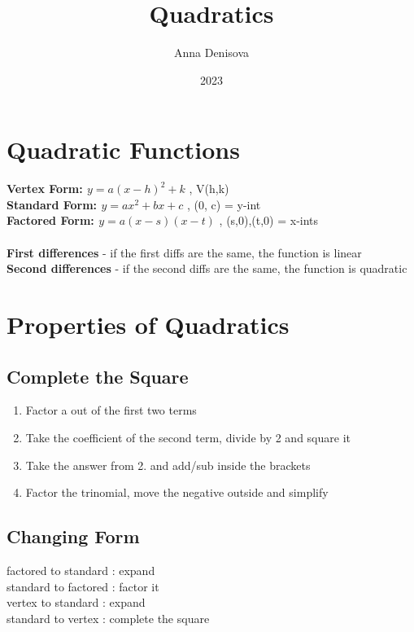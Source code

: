 \documentclass{article}
\title{Quadratics}
\author{Anna Denisova}
\date{2023}
\begin{document}
\maketitle



\newpage
\section{Quadratic Functions}

\textbf{Vertex Form: $y = a(x-h)^2+k$} , V(h,k) \\
\textbf{Standard Form: $y = ax^2+bx+c$} , (0, c) = y-int \\
\textbf{Factored Form: $y = a(x-s)(x-t)$} , (s,0),(t,0) = x-ints\\\\

\noindent
\textbf{First differences} - if the first diffs are the same, the function is linear \\
\textbf{Second differences} - if the second diffs are the same, the function is quadratic\\


\section{Properties of Quadratics}

\subsection*{Complete the Square}
\begin{enumerate}
    \item Factor a out of the first two terms
    \item Take the coefficient of the second term, divide by 2 and square it
    \item Take the answer from 2. and add/sub inside the brackets
    \item Factor the trinomial, move the negative outside and simplify
\end{enumerate}

\subsection*{Changing Form}
factored to standard : expand\\
standard to factored : factor it\\
vertex to standard : expand \\
standard to vertex : complete the square
\end{document}
